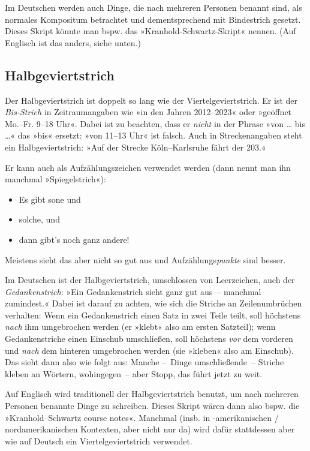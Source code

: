 Im Deutschen werden auch Dinge, die nach mehreren Personen benannt
sind, als normales Kompositum betrachtet und dementsprechend mit
Bindestrich gesetzt.  Dieses Skript könnte man bspw. das
»Kranhold-Schwartz-Skript« nennen.  (Auf Englisch ist das anders,
siehe unten.)

\subsection{Halbgeviertstrich}
\label{subsec:halbgeviert}
Der Halbgeviertstrich \Char{--} ist doppelt so lang wie der
Viertelgeviertstrich.  Er ist der \emph{Bis-Strich} in Zeitraumangaben
wie »in den Jahren 2012--2023« oder »geöffnet Mo.--Fr. 9--18 Uhr«.
Dabei ist zu beachten, dass er \emph{nicht} in der Phrase »von … bis
…« das »bis« ersetzt: »von 11--13 Uhr« ist falsch.  Auch in
Streckenangaben steht ein Halbgeviertstrich: »Auf der Strecke
Köln--Karlsruhe fährt der  203.«

Er kann auch als Aufzählungszeichen verwendet werden (dann nennt man
ihn manchmal »Spiegelstrich«):
 \begin{itemize}[label=--,nosep]
 \item Es gibt sone und
 \item solche, und
 \item dann gibt's noch ganz andere!
 \end{itemize}
 Meistens sieht das aber nicht so gut aus und Aufzählungs\emph{punkte}
 \Char{\textbullet} sind besser.

Im Deutschen ist der Halbgeviertstrich, umschlossen von Leerzeichen,
auch der \emph{Gedankenstrich}: »Ein Gedankenstrich sieht ganz gut
aus~-- manchmal zumindest.«  Dabei ist darauf zu achten, wie sich die
Striche an Zeilenumbrüchen verhalten: Wenn ein Gedankenstrich einen
Satz in zwei Teile teilt, soll höchstens \emph{nach} ihm umgebrochen
werden (er »klebt« also am ersten Satzteil); wenn Gedankenstriche
einen Einschub umschließen, soll höchstens \emph{vor} dem vorderen und
\emph{nach} dem hinteren umgebrochen werden (sie »kleben« also am
Einschub).  Das sieht dann also wie folgt aus:  Manche --~Dinge
umschließende~-- Striche kleben an Wörtern, wohingegen~--
aber Stopp, das führt jetzt zu weit.

Auf Englisch wird traditionell der Halbgeviertstrich benutzt, um nach
mehreren Personen benannte Dinge zu schreiben.  Dieses Skript wären
dann also bspw. die »\foreignlanguage{british}{Kranhold--Schwartz
  course notes}«.  Manchmal (insb. in -amerikanischen /
nordamerikanischen Kontexten, aber nicht nur da) wird dafür
stattdessen aber wie auf Deutsch ein Viertelgeviertstrich verwendet.


